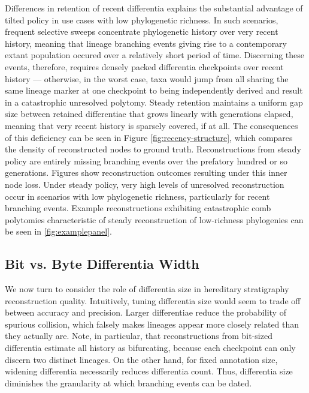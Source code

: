 Differences in retention of recent differentia explains the substantial advantage of tilted policy in use cases with low phylogenetic richness.
In such scenarios, frequent selective sweeps concentrate phylogenetic history over very recent history, meaning that lineage branching events giving rise to a contemporary extant population occured over a relatively short period of time.
Discerning these events, therefore, requires densely packed differentia checkpoints over recent history --- otherwise, in the worst case, taxa would jump from all sharing the same lineage marker at one checkpoint to being independently derived and result in a catastrophic unresolved polytomy.
Steady retention maintains a uniform gap size between retained differentiae that grows linearly with generations elapsed, meaning that very recent history is sparsely covered, if at all.
The consequences of this deficiency can be seen in Figure \ref{fig:recency-structure}, which compares the density of reconstructed nodes to ground truth.
Reconstructions from steady policy are entirely missing branching events over the prefatory hundred or so generations.
Figures  show reconstruction outcomes resulting under this inner node loss.
Under steady policy, very high levels of unresolved reconstruction occur in scenarios with low phylogenetic richness, particularly for recent branching events.
Example reconstructions exhibiting catastrophic comb polytomies characteristic of steady reconstruction of low-richness phylogenies can be seen in \ref{fig:examplepanel}.

\subsection{Bit vs. Byte Differentia Width} \label{sec:bit-vs-byte}



We now turn to consider the role of differentia size in hereditary stratigraphy reconstruction quality.
Intuitively, tuning differentia size would seem to trade off between accuracy and precision.
Larger differentiae reduce the probability of spurious collision, which falsely makes lineages appear more closely related than they actually are.
Note, in particular, that reconstructions from bit-sized differentia estimate all history as bifurcating, because each checkpoint can only discern two distinct lineages.
On the other hand, for fixed annotation size, widening differentia necessarily reduces differentia count.
Thus, differentia size diminishes the granularity at which branching events can be dated.

